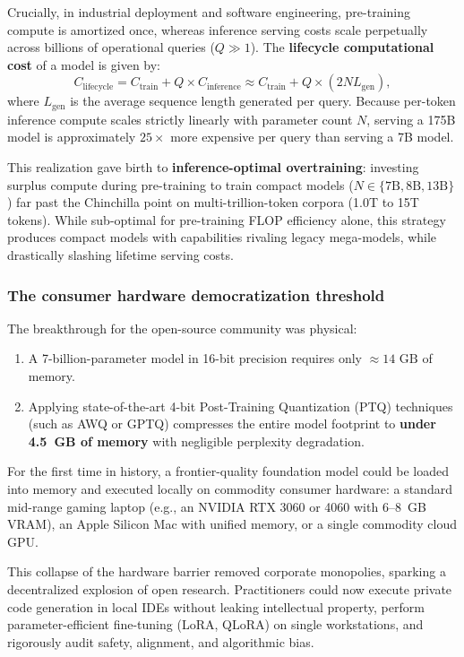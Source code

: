 \documentclass[../../main.tex]{subfiles}
\begin{document}
Crucially, in industrial deployment and software engineering, pre-training compute is amortized once, whereas inference serving costs scale perpetually across billions of operational queries ($Q \gg 1$). The \textbf{lifecycle computational cost} of a model is given by:
\begin{equation}
\label{eq:lifecycle_compute_open_models}
C_{\text{lifecycle}} = C_{\text{train}} + Q \times C_{\text{inference}} \approx C_{\text{train}} + Q \times \left( 2 N L_{\text{gen}} \right),
\end{equation}
where $L_{\text{gen}}$ is the average sequence length generated per query. Because per-token inference compute scales strictly linearly with parameter count $N$, serving a 175B model is approximately $25\times$ more expensive per query than serving a 7B model. 

This realization gave birth to \textbf{inference-optimal overtraining}: investing surplus compute during pre-training to train compact models ($N \in \{7\text{B}, 8\text{B}, 13\text{B}\}$) far past the Chinchilla point on multi-trillion-token corpora (1.0T to 15T tokens). While sub-optimal for pre-training FLOP efficiency alone, this strategy produces compact models with capabilities rivaling legacy mega-models, while drastically slashing lifetime serving costs.

\subsubsection{The consumer hardware democratization threshold}
The breakthrough for the open-source community was physical:
\begin{enumerate}
    \item A 7-billion-parameter model in 16-bit precision requires only $\approx 14\text{ GB}$ of memory.
    \item Applying state-of-the-art 4-bit Post-Training Quantization (PTQ) techniques (such as AWQ or GPTQ) compresses the entire model footprint to \textbf{under 4.5~GB of memory} with negligible perplexity degradation.
\end{enumerate}
For the first time in history, a frontier-quality foundation model could be loaded into memory and executed locally on commodity consumer hardware: a standard mid-range gaming laptop (e.g., an NVIDIA RTX 3060 or 4060 with 6--8~GB VRAM), an Apple Silicon Mac with unified memory, or a single commodity cloud GPU. 

This collapse of the hardware barrier removed corporate monopolies, sparking a decentralized explosion of open research. Practitioners could now execute private code generation in local IDEs without leaking intellectual property, perform parameter-efficient fine-tuning (LoRA, QLoRA) on single workstations, and rigorously audit safety, alignment, and algorithmic bias.
\end{document}
